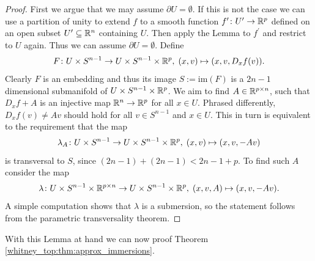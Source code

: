\begin{proof}
    First we argue that we may assume $\partial U = \emptyset$. If this is not the case we can use a partition of unity to extend $f$ to a smooth function $f^\prime \colon U^\prime \to \mathbb{R}^p$ defined on an open subset $U^\prime \subseteq \mathbb{R}^n$ containing $U$. Then apply the Lemma to $f^\prime$ and restrict to $U$ again. Thus we can assume $\partial U = \emptyset$. Define 
    \[
    F \colon  U \times S^{n-1} \to U \times S^{n-1} \times \mathbb{R}^p, \; (x,v) \mapsto (x,v,D_xf(v)).
    \]
    Clearly $F$ is an embedding and thus its image $S := \mathrm{im}(F)$ is a $2n-1$ dimensional submanifold of $U \times S^{n-1} \times \mathbb{R}^p$. We aim to find $A \in \mathbb{R}^{p \times n}$, such that $D_xf + A$ is an injective map $\mathbb{R}^n \to \mathbb{R}^p$ for all $x \in U$. Phrased differently, $D_xf(v) \neq Av$ should hold for all $v \in S^{n-1}$ and $x \in U$. This in turn is equivalent to the requirement that the map 
    \[
    \lambda_A \colon U \times S^{n-1} \to U \times S^{n-1} \times \mathbb{R}^p, \; (x,v) \mapsto (x,v,-Av)
    \]
    is transversal to $S$, since $(2n-1) + (2n-1) < 2n-1 + p$. To find such $A$ consider the map 
    \[
    \lambda \colon U \times S^{n-1} \times \mathbb{R}^{p \times n} \to U \times S^{n-1} \times \mathbb{R}^p,\; (x,v,A) \mapsto (x,v,-Av).  
    \]
    A simple computation shows that $\lambda$ is a submersion, so the statement follows from the parametric transversality theorem.
\end{proof}

With this Lemma at hand we can now proof Theorem \ref{whitney_top:thm:approx_immersions}.


